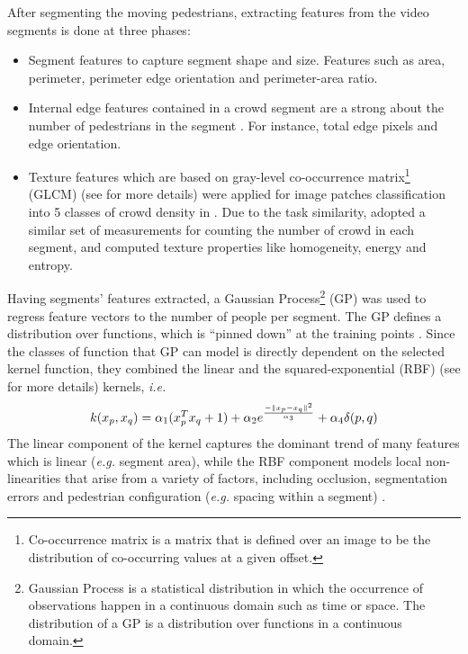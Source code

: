 After segmenting the moving pedestrians, extracting features from the video segments is done at three phases:
\begin{itemize}
	\item Segment features to capture segment shape and size. Features such as area, perimeter, perimeter edge orientation and perimeter-area ratio. 
	\item Internal edge features contained in a crowd segment are a strong about the number of pedestrians in the segment \cite{davies1995crowd, kong2005counting}. For instance, total edge pixels and edge orientation. 
	\item Texture features which are based on gray-level co-occurrence matrix\footnote{Co-occurrence matrix is a matrix that is defined over an image to be the distribution of co-occurring values at a given offset.} (GLCM) (see  \cite{haralick1973textural} for more details) were applied for image patches classification into 5 classes of crowd density in \cite{marana1998efficacy}. Due to the task similarity, \citeauthor*{chan2008privacy} adopted a similar set of measurements for counting the number of crowd in each segment, and computed texture properties like homogeneity, energy and entropy. 
\end{itemize} 
Having segments' features extracted, a Gaussian Process\footnote{Gaussian Process is a statistical distribution in which the occurrence of observations happen in a continuous domain such as time or space. The distribution of a GP is a distribution over functions in a continuous domain.} (GP)  was used to regress feature vectors to the number of people per segment. The GP defines a distribution over functions, which is “pinned down” at the training points \cite{chan2008privacy}. Since the classes of function that GP can model is directly dependent on the selected kernel function, they combined the linear and the squared-exponential (RBF) (see \cite{chang2010training, vert2004primer, shashua2009introduction} for more details) kernels, \textit{i.e.}
\begin{equation}
\centering k(x_p, x_q) = \alpha_1(x_p^{T}x_q+1) + \alpha_2e^{\frac{-\|x_p-x_q\|^2}{\alpha_3}} + \alpha_4\delta(p,q)     
\end{equation}
The linear component of the kernel captures the dominant trend of many features which is linear (\textit{e.g.} segment area), while the RBF component models local non-linearities that arise from a variety of factors, including occlusion, segmentation errors and pedestrian configuration (\textit{e.g.} spacing within a segment) \cite{chan2008privacy}. 
  
